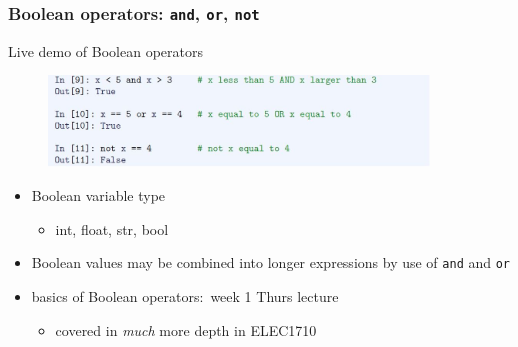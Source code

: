 \documentclass[english,14pt]{beamer}
\newcommand\red[1]{{\color{red} #1}}
\begin{document}

\begin{frame}[fragile]

\frametitle{Boolean operators: \texttt{and}, \texttt{or}, \texttt{not}}

Live demo of Boolean operators

\begin{figure}[ht]
	\centering
	\includegraphics[width=0.9\textwidth]{figures/LLp47a}
\end{figure}

\begin{itemize}
	\item Boolean variable type
	\begin{itemize}
		\item int, float, str, \red{bool}
	\end{itemize}

	\item Boolean values may be combined into longer expressions by use of \texttt{and} and \texttt{or}
	\item basics of Boolean operators:~week 1 Thurs lecture
	\begin{itemize}
		\item covered in \emph{much} more depth in ELEC1710
	\end{itemize}
\end{itemize}

\end{frame}

%
%
%
%

\end{document}
